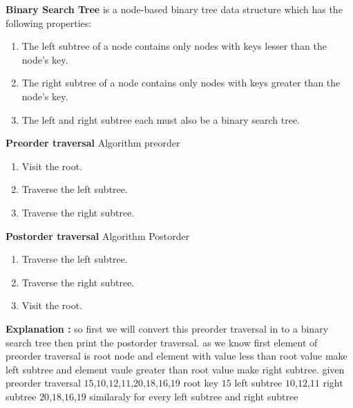 \documentclass[journal,12pt,twocolumn]{IEEEtran}
\begin{document}
\textbf{Binary Search Tree} is a node-based binary tree data structure which has the following properties:
\begin{enumerate}
    \item The left subtree of a node contains only nodes with keys lesser than the node’s key.
    \item The right subtree of a node contains only nodes with keys greater than the node’s key.
    \item The left and right subtree each must also be a binary search tree.
\end{enumerate}
\textbf{Preorder traversal} 
\newline
 Algorithm preorder
 \begin{enumerate}
     \item Visit the root.
     \item Traverse the left subtree.
     \item Traverse the right subtree.
 \end{enumerate}
 \textbf{Postorder traversal} 
 \newline
 Algorithm Postorder
 \begin{enumerate}
     \item Traverse the left subtree.
     \item Traverse the right subtree.
     \item Visit the root.
 \end{enumerate}
 \textbf{Explanation : } 
 \newline so  first we will convert this preorder traversal in to a binary search tree then print the postorder traversal.
 \newline 
 as we know first element of preorder traversal is root node and element with value less than root value make left subtree and element vaule greater than root value make right subtree.
 \newline
 \newline given preorder traversal $15$,$10$,$12$,$11$,$20$,$18$,$16$,$19$
\newline
root key      $15$
\newline
left subtree  $10$,$12$,$11$
\newline
right subtree $20$,$18$,$16$,$19$
\newline
similaraly for every left subtree and right subtree
\vspace{5mm}
\end{document}
